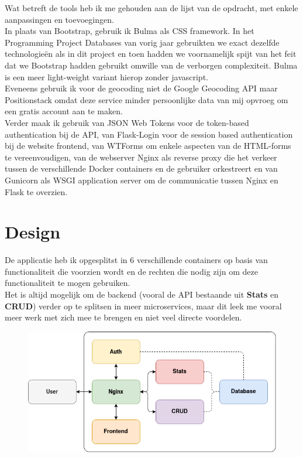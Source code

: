 \documentclass[10pt]{article}
\begin{document}
Wat betreft de tools heb ik me gehouden aan de lijst van de opdracht, met enkele aanpassingen en toevoegingen.\\
In plaats van Bootstrap, gebruik ik Bulma als CSS framework. In het Programming Project Databases van vorig jaar gebruikten we exact dezelfde technologieën als in dit project en toen hadden we voornamelijk spijt van het feit dat we Bootstrap hadden gebruikt omwille van de verborgen complexiteit. Bulma is een meer light-weight variant hierop zonder javascript.\\
Eveneens gebruik ik voor de geocoding niet de Google Geocoding API maar Positionstack omdat deze service minder persoonlijke data van mij opvroeg om een gratis account aan te maken.\\
Verder maak ik gebruik van JSON Web Tokens voor de token-based authentication bij de API, van Flask-Login voor de session based authentication bij de website frontend, van WTForms om enkele aspecten van de HTML-forms te vereenvoudigen, van de webserver Nginx als reverse proxy die het verkeer tussen de verschillende Docker containers en de gebruiker orkestreert en van Gunicorn als WSGI application server om de communicatie tussen Nginx en Flask te overzien.

\clearpage
\section{Design}
De applicatie heb ik opgesplitst in 6 verschillende containers op basis van functionaliteit die voorzien wordt en de rechten die nodig zijn om deze functionaliteit te mogen gebruiken.\\
Het is altijd mogelijk om de backend (vooral de API bestaande uit \textbf{Stats} en \textbf{CRUD}) verder op te splitsen in meer microservices, maar dit leek me vooral meer werk met zich mee te brengen en niet veel directe voordelen.

\begin{figure}[H]
	\centerline{\includegraphics[width=\linewidth]{diagram}}
\end{figure}
\end{document}
